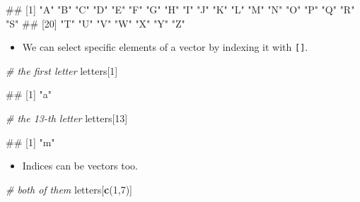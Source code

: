 \documentclass[
]{book}
\newenvironment{Shaded}{\begin{snugshade}}{\end{snugshade}}
\newcommand{\CommentTok}[1]{\textcolor[rgb]{0.56,0.35,0.01}{\textit{#1}}}
\newcommand{\DecValTok}[1]{\textcolor[rgb]{0.00,0.00,0.81}{#1}}
\newcommand{\FunctionTok}[1]{\textcolor[rgb]{0.13,0.29,0.53}{\textbf{#1}}}
\newcommand{\NormalTok}[1]{#1}
\providecommand{\tightlist}{%
  \setlength{\itemsep}{0pt}\setlength{\parskip}{0pt}}
\begin{document}
\begin{Shaded}
\begin{Highlighting}[]
\NormalTok{\#\#  [1] "A" "B" "C" "D" "E" "F" "G" "H" "I" "J" "K" "L" "M" "N" "O" "P" "Q" "R" "S"}
\NormalTok{\#\# [20] "T" "U" "V" "W" "X" "Y" "Z"}
\end{Highlighting}
\end{Shaded}

\begin{itemize}
\tightlist
\item
  We can select specific elements of a vector by indexing it with \texttt{{[}{]}}.
\end{itemize}

\begin{Shaded}
\begin{Highlighting}[]
\CommentTok{\# the first letter}
\NormalTok{letters[}\DecValTok{1}\NormalTok{]}
\end{Highlighting}
\end{Shaded}

\begin{Shaded}
\begin{Highlighting}[]
\NormalTok{\#\# [1] "a"}
\end{Highlighting}
\end{Shaded}

\begin{Shaded}
\begin{Highlighting}[]
\CommentTok{\# the 13{-}th letter}
\NormalTok{letters[}\DecValTok{13}\NormalTok{]}
\end{Highlighting}
\end{Shaded}

\begin{Shaded}
\begin{Highlighting}[]
\NormalTok{\#\# [1] "m"}
\end{Highlighting}
\end{Shaded}

\begin{itemize}
\tightlist
\item
  Indices can be vectors too.
\end{itemize}

\begin{Shaded}
\begin{Highlighting}[]
\CommentTok{\# both of them}
\NormalTok{letters[}\FunctionTok{c}\NormalTok{(}\DecValTok{1}\NormalTok{,}\DecValTok{7}\NormalTok{)]}
\end{Highlighting}
\end{Shaded}
\end{document}
